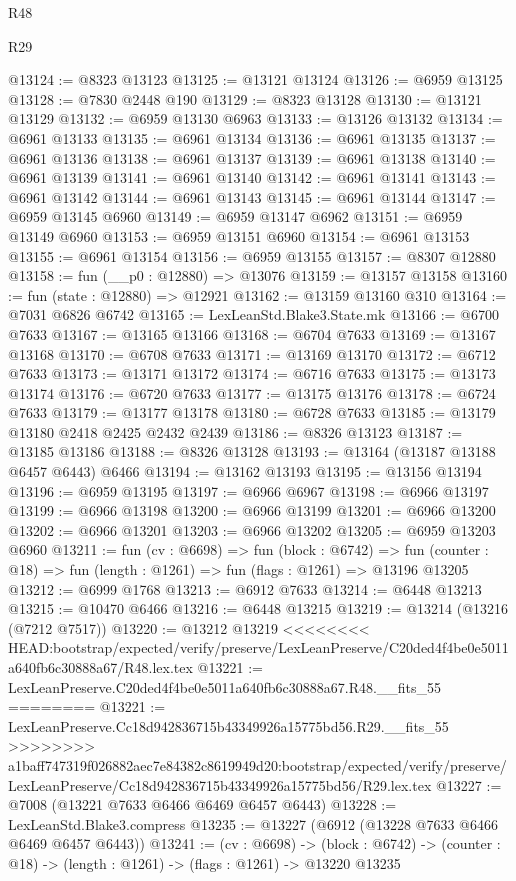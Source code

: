 \begin{lexlean}{R48}
\begin{lexlean}{R29}
\begin{coremodule}
{{{{{{{{{{{{{{{{{{{{{{{{{{{{{{{{{{{{{{{{{{{{{{{{{{{{{{{{{{{{{{{{{{{{{{{{{{{{{{{{{{{{{{{{{{{{{{{{{{{{{{{{{{{{{{{{{{{{{{{{{{{{{{{{{{{{{{{{{{{{{{{{{{{{{{{{{{{{{{{{{{{{{{{{{{{{{{{{{{{{{{{{{{{{{{{{{{{{{{{{{{{{{{{{{{{{{{{{{{@13124 := @8323 @13123
@13125 := @13121 @13124
@13126 := @6959 @13125
@13128 := @7830 @2448 @190
@13129 := @8323 @13128
@13130 := @13121 @13129
@13132 := @6959 @13130 @6963
@13133 := @13126 @13132
@13134 := @6961 @13133
@13135 := @6961 @13134
@13136 := @6961 @13135
@13137 := @6961 @13136
@13138 := @6961 @13137
@13139 := @6961 @13138
@13140 := @6961 @13139
@13141 := @6961 @13140
@13142 := @6961 @13141
@13143 := @6961 @13142
@13144 := @6961 @13143
@13145 := @6961 @13144
@13147 := @6959 @13145 @6960
@13149 := @6959 @13147 @6962
@13151 := @6959 @13149 @6960
@13153 := @6959 @13151 @6960
@13154 := @6961 @13153
@13155 := @6961 @13154
@13156 := @6959 @13155
@13157 := @8307 @12880
@13158 := fun (__p0 : @12880) => @13076
@13159 := @13157 @13158
@13160 := fun (state : @12880) => @12921
@13162 := @13159 @13160 @310
@13164 := @7031 @6826 @6742
@13165 := LexLeanStd.Blake3.State.mk
@13166 := @6700 @7633
@13167 := @13165 @13166
@13168 := @6704 @7633
@13169 := @13167 @13168
@13170 := @6708 @7633
@13171 := @13169 @13170
@13172 := @6712 @7633
@13173 := @13171 @13172
@13174 := @6716 @7633
@13175 := @13173 @13174
@13176 := @6720 @7633
@13177 := @13175 @13176
@13178 := @6724 @7633
@13179 := @13177 @13178
@13180 := @6728 @7633
@13185 := @13179 @13180 @2418 @2425 @2432 @2439
@13186 := @8326 @13123
@13187 := @13185 @13186
@13188 := @8326 @13128
@13193 := @13164 (@13187 @13188 @6457 @6443) @6466
@13194 := @13162 @13193
@13195 := @13156 @13194
@13196 := @6959 @13195
@13197 := @6966 @6967
@13198 := @6966 @13197
@13199 := @6966 @13198
@13200 := @6966 @13199
@13201 := @6966 @13200
@13202 := @6966 @13201
@13203 := @6966 @13202
@13205 := @6959 @13203 @6960
@13211 := fun (cv : @6698) =>
  fun (block : @6742) =>
  fun (counter : @18) => fun (length : @1261) => fun (flags : @1261) => @13196 @13205
@13212 := @6999 @1768
@13213 := @6912 @7633
@13214 := @6448 @13213
@13215 := @10470 @6466
@13216 := @6448 @13215
@13219 := @13214 (@13216 (@7212 @7517))
@13220 := @13212 @13219
<<<<<<<< HEAD:bootstrap/expected/verify/preserve/LexLeanPreserve/C20ded4f4be0e5011a640fb6c30888a67/R48.lex.tex
@13221 := LexLeanPreserve.C20ded4f4be0e5011a640fb6c30888a67.R48.__fits_55
========
@13221 := LexLeanPreserve.Cc18d942836715b43349926a15775bd56.R29.__fits_55
>>>>>>>> a1baff747319f026882aec7e84382c8619949d20:bootstrap/expected/verify/preserve/LexLeanPreserve/Cc18d942836715b43349926a15775bd56/R29.lex.tex
@13227 := @7008 (@13221 @7633 @6466 @6469 @6457 @6443)
@13228 := LexLeanStd.Blake3.compress
@13235 := @13227 (@6912 (@13228 @7633 @6466 @6469 @6457 @6443))
@13241 := (cv : @6698) ->
  (block : @6742) -> (counter : @18) -> (length : @1261) -> (flags : @1261) -> @13220 @13235
}}}}}}}}}}}}}}}}}}}}}}}}}}}}}}}}}}}}}}}}}}}}}}}}}}}}}}}}}}}}}}}}}}}}}}}}}}}}}}}}}}}}}}}}}}}}}}}}}}}}}}}}}}}}}}}}}}}}}}}}}}}}}}}}}}}}}}}}}}}}}}}}}}}}}}}}}}}}}}}}}}}}}}}}}}}}}}}}}}}}}}}}}}}}}}}}}}}}}}}}}}}}}}}}}}}}}}}}}}
\end{coremodule}
\end{lexlean}
\end{lexlean}

